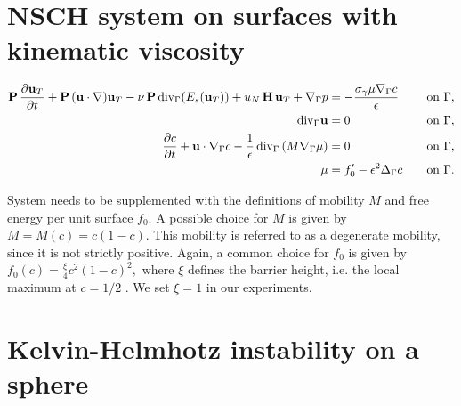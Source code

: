 \documentclass{article}
\newcommand{\vect}[1]{\boldsymbol{\mathbf{#1}}}
\newcommand{\bu}{\mathbf u}
\newcommand{\divG}{{\mathop{\,\rm div}}_{\Gamma}}
\newcommand{\gradG}{\nabla_{\Gamma}}
\newcommand{\nablaG}{\nabla_{\Gamma}}
\newcommand{\laplG}{\Delta_{\Gamma}}
\begin{document}
	\tableofcontents
\newpage	
\section{NSCH system on surfaces with kinematic viscosity}
\begin{align}
 \vect P\,\frac{\partial\vect u_T}{\partial t} + \vect P\,(\vect u\cdot\nabla)\vect u_T - \nu\,\vect P\divG(E_s(\vect u_T)) + u_N\,\vect H\,\vect u_T + \nabla_\Gamma p &=   - \frac{\sigma_\gamma \mu \nablaG c}{\epsilon} \quad &\text{on}~\Gamma,  \label{strongform-1} \\
\divG \bu & =0 \quad &\text{on}~\Gamma, \label{strongform-2}\\
 \frac{\partial c}{\partial t} +\bu\cdot\nablaG c-  \frac{1}{\epsilon}\divG \left(M \gradG \mu \right)  &= 0 \quad &\text{on}~\Gamma \label{eq:sys_CH1}, \\
\mu &= f_0' - \epsilon^2 \laplG c \quad &\text{on}~\Gamma. \label{eq:sys_CH2}
\end{align}


System needs to be supplemented with the
definitions of mobility $M$ and free energy per unit surface $f_0$. A possible choice for $M$
is given by $M = M(c) = c(1 - c).$
This mobility is referred to as a degenerate mobility, since it is not strictly positive.
Again, a common choice for $f_0$ is given by $f_0(c) = \frac{\xi}{4} c^2(1 - c)^2,$
where $\xi$ defines the barrier height, i.e. the local maximum at $c = 1/2$ . We set  $\xi = 1$ in our experiments.


\section{Kelvin-Helmhotz instability on a sphere}
\end{document}
